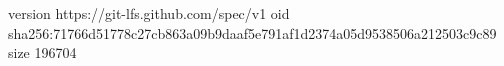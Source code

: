 version https://git-lfs.github.com/spec/v1
oid sha256:71766d51778c27cb863a09b9daaf5e791af1d2374a05d9538506a212503c9c89
size 196704
